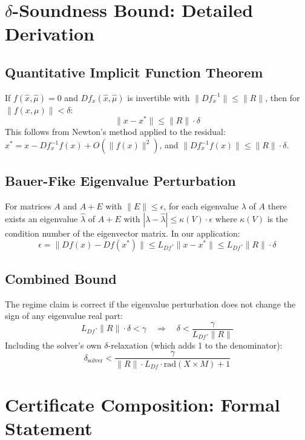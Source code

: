 \documentclass[11pt]{article}
\newcommand{\norm}[1]{\|#1\|}
\begin{document}
\section{$\delta$-Soundness Bound: Detailed Derivation}
\label{app:delta}

\subsection{Quantitative Implicit Function Theorem}

If $f(\hat{x}, \hat{\mu}) = 0$ and $Df_x(\hat{x}, \hat{\mu})$ is invertible with $\norm{Df_x^{-1}} \leq \norm{R}$, then for $\norm{f(x, \mu)} < \delta$:
\[
\norm{x - x^*} \leq \norm{R} \cdot \delta
\]
This follows from Newton's method applied to the residual: $x^* = x - Df_x^{-1} f(x) + O(\norm{f(x)}^2)$, and $\norm{Df_x^{-1} f(x)} \leq \norm{R} \cdot \delta$.

\subsection{Bauer-Fike Eigenvalue Perturbation}

For matrices $A$ and $A + E$ with $\norm{E} \leq \epsilon$, for each eigenvalue $\lambda$ of $A$ there exists an eigenvalue $\hat{\lambda}$ of $A + E$ with $|\lambda - \hat{\lambda}| \leq \kappa(V) \cdot \epsilon$ where $\kappa(V)$ is the condition number of the eigenvector matrix.
In our application:
\[
\epsilon = \norm{Df(x) - Df(x^*)} \leq L_{Df} \cdot \norm{x - x^*} \leq L_{Df} \cdot \norm{R} \cdot \delta
\]

\subsection{Combined Bound}

The regime claim is correct if the eigenvalue perturbation does not change the sign of any eigenvalue real part:
\[
L_{Df} \cdot \norm{R} \cdot \delta < \gamma \quad \Rightarrow \quad \delta < \frac{\gamma}{L_{Df} \cdot \norm{R}}
\]
Including the solver's own $\delta$-relaxation (which adds 1 to the denominator):
\[
\delta_{\mathrm{solver}} < \frac{\gamma}{\norm{R} \cdot L_{Df} \cdot \mathrm{rad}(X \times M) + 1}
\]

\section{Certificate Composition: Formal Statement}
\label{app:composition}
\end{document}
